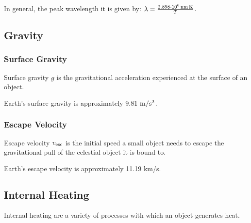 \documentclass[letterpaper,10pt,english]{sphinxmanual}
\begin{document}
\sphinxAtStartPar
In general, the peak wavelength it is given by: \(\lambda = \frac{2.898 \cdot 10 ^ 6 \,{\rm nm\, K}}{T}\).


\subsection{Gravity}
\label{\detokenize{quantities/surface/gravity/gravity:gravity}}\label{\detokenize{quantities/surface/gravity/gravity::doc}}\label{\detokenize{quantities/surface/gravity/gravity:id1}}

\subsubsection{Surface Gravity}
\label{\detokenize{quantities/surface/gravity/surface_gravity:surface-gravity}}\label{\detokenize{quantities/surface/gravity/surface_gravity::doc}}\label{\detokenize{quantities/surface/gravity/surface_gravity:id1}}
\sphinxAtStartPar
Surface gravity \(g\) is the gravitational acceleration experienced at
the surface of an object.

\sphinxAtStartPar
Earth’s surface gravity is approximately 9.81 \({\rm m/s^2}\).


\subsubsection{Escape Velocity}
\label{\detokenize{quantities/surface/gravity/escape_velocity:escape-velocity}}\label{\detokenize{quantities/surface/gravity/escape_velocity::doc}}\label{\detokenize{quantities/surface/gravity/escape_velocity:id1}}
\sphinxAtStartPar
Escape velocity \(v_{\rm esc}\) is the initial speed a small object needs to escape the gravitational
pull of the celestial object it is bound to.

\sphinxAtStartPar
Earth’s escape velocity is approximately 11.19 km/s.


\subsection{Internal Heating}
\label{\detokenize{quantities/surface/internal_heating/internal_heating:internal-heating}}\label{\detokenize{quantities/surface/internal_heating/internal_heating::doc}}\label{\detokenize{quantities/surface/internal_heating/internal_heating:id1}}
\sphinxAtStartPar
Internal heating are a variety of processes with which an object generates heat.
\end{document}
